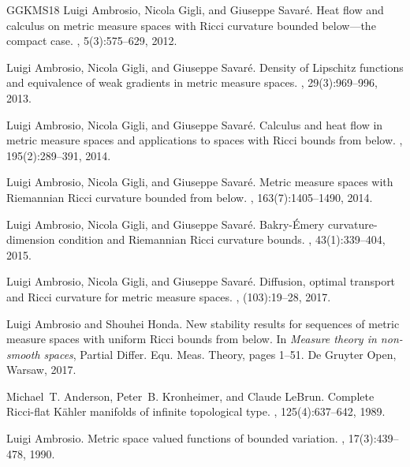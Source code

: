 \documentclass[11pt]{article}
\numberwithin{equation}{section}
\begin{document}
{\begin{thebibliography}{GGKMS18}
Luigi Ambrosio, Nicola Gigli, and Giuseppe Savar{\'e}.
\newblock Heat flow and calculus on metric measure spaces with {R}icci
  curvature bounded below---the compact case.
, 5(3):575--629, 2012.

Luigi Ambrosio, Nicola Gigli, and Giuseppe Savar{\'e}.
\newblock Density of {L}ipschitz functions and equivalence of weak gradients in
  metric measure spaces.
, 29(3):969--996, 2013.

Luigi Ambrosio, Nicola Gigli, and Giuseppe Savar{\'e}.
\newblock Calculus and heat flow in metric measure spaces and applications to
  spaces with {R}icci bounds from below.
, 195(2):289--391, 2014.

Luigi Ambrosio, Nicola Gigli, and Giuseppe Savar{\'e}.
\newblock Metric measure spaces with {R}iemannian {R}icci curvature bounded
  from below.
, 163(7):1405--1490, 2014.

Luigi Ambrosio, Nicola Gigli, and Giuseppe Savar{\'e}.
\newblock Bakry-\'{E}mery curvature-dimension condition and {R}iemannian
  {R}icci curvature bounds.
, 43(1):339--404, 2015.

Luigi Ambrosio, Nicola Gigli, and Giuseppe Savar{\'e}.
\newblock Diffusion, optimal transport and {R}icci curvature for metric measure
  spaces.
, (103):19--28, 2017.

Luigi Ambrosio and Shouhei Honda.
\newblock New stability results for sequences of metric measure spaces with
  uniform {R}icci bounds from below.
\newblock In {\em Measure theory in non-smooth spaces}, Partial Differ. Equ.
  Meas. Theory, pages 1--51. De Gruyter Open, Warsaw, 2017.

Michael~T. Anderson, Peter~B. Kronheimer, and Claude LeBrun.
\newblock Complete {R}icci-flat {K}\"{a}hler manifolds of infinite topological
  type.
, 125(4):637--642, 1989.

Luigi Ambrosio.
\newblock Metric space valued functions of bounded variation.
, 17(3):439--478, 1990.


\end{thebibliography}}
\end{document}
